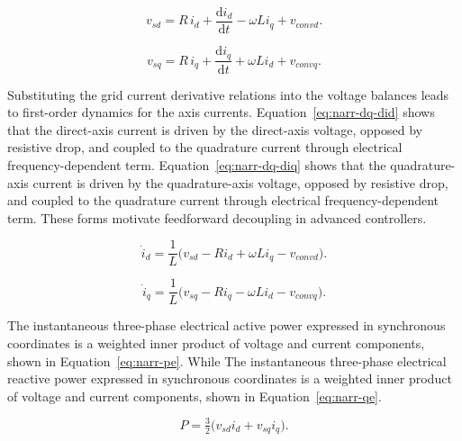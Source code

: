 \begin{equation}
\label{eq:narr-dq-vd}
v_{sd} = R\, i_d + \frac{\mathrm d i_d}{\mathrm d t} - \omega L i_q + v_{convd}.
\end{equation}



\begin{equation}
\label{eq:narr-dq-vq}
v_{sq} = R\, i_q + \frac{\mathrm d i_q}{\mathrm d t} + \omega L i_d + v_{convq}.
\end{equation}



Substituting the grid current derivative relations into the voltage balances leads to first-order dynamics for the axis currents. Equation~\eqref{eq:narr-dq-did} shows that the direct-axis current is driven by the direct-axis voltage, opposed by resistive drop, and coupled to the quadrature current through electrical frequency-dependent term. Equation~\eqref{eq:narr-dq-diq} shows that the quadrature-axis current is driven by the quadrature-axis voltage, opposed by resistive drop, and coupled to the quadrature current through electrical frequency-dependent term. These forms motivate feedforward decoupling in advanced controllers.



\begin{equation}
\label{eq:narr-dq-did}
\dot{i}_d = \frac{1}{L} \Big( v_{sd} - R i_d + \omega L i_q - v_{convd}\Big) .
\end{equation}



\begin{equation}
\label{eq:narr-dq-diq}
\dot{i}_q = \frac{1}{L} \Big( v_{sq} - R i_q - \omega L i_d - v_{convq}\Big) .
\end{equation}



The instantaneous three-phase electrical active power expressed in synchronous coordinates is a weighted inner product of voltage and current components, shown in Equation~\eqref{eq:narr-pe}. While The instantaneous three-phase electrical reactive power expressed in synchronous coordinates is a weighted inner product of voltage and current components, shown in Equation~\eqref{eq:narr-qe}.

\begin{equation}
\label{eq:narr-pe}
P = \tfrac{3}{2} \big( v_{sd} i_d + v_{sq} i_q \big) .
\end{equation}



